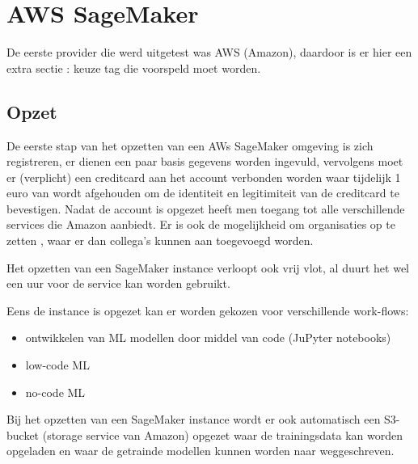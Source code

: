 \chapter{AWS SageMaker}
De eerste provider die werd uitgetest was AWS (Amazon), daardoor is er hier een extra sectie : keuze tag die voorspeld moet worden. 
\section{Opzet}
De eerste stap van het opzetten van een AWs SageMaker omgeving is zich registreren, er dienen een paar basis gegevens worden ingevuld, vervolgens moet er (verplicht) een creditcard aan het account verbonden worden waar tijdelijk 1 euro van wordt afgehouden om de identiteit en legitimiteit van de creditcard te bevestigen. Nadat de account is opgezet heeft men toegang tot alle verschillende services die Amazon aanbiedt. Er is ook de mogelijkheid om organisaties op te zetten , waar er dan collega's kunnen aan toegevoegd worden.

Het opzetten van een SageMaker instance verloopt ook vrij vlot, al duurt het wel een uur voor de service kan worden gebruikt. 

Eens de instance is opgezet kan er worden gekozen voor verschillende work-flows: 
\begin{itemize}
    \item ontwikkelen van ML modellen door middel van code (JuPyter notebooks)
    \item low-code ML
    \item no-code ML
\end{itemize}

Bij het opzetten van een SageMaker instance wordt er ook automatisch een S3-bucket (storage service van Amazon) opgezet waar de trainingsdata kan worden opgeladen en waar de getrainde modellen kunnen worden naar weggeschreven. 

